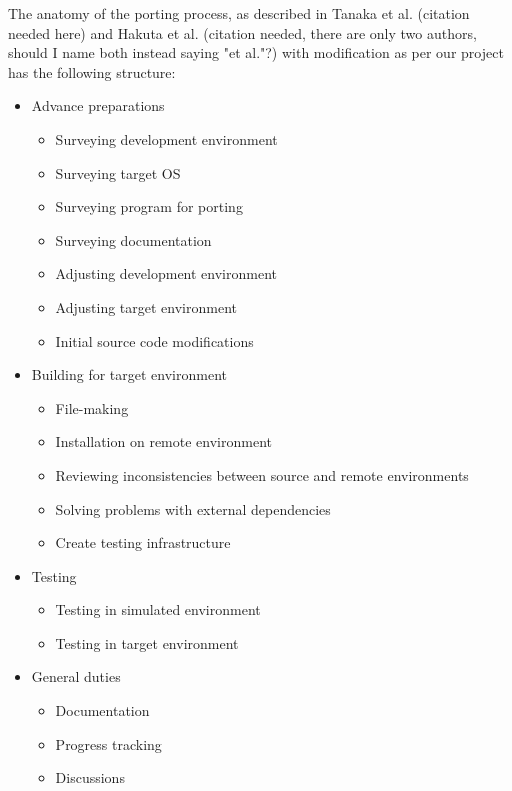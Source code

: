 The anatomy of the porting process, as described in Tanaka et al. (citation
needed here) and Hakuta et al. (citation needed, there are only two authors,
should I name both instead saying "et al."?) with modification as per our
project has the following structure:
\begin{itemize}
    \item Advance preparations
        \begin{itemize}
            \item Surveying development environment
            \item Surveying target OS
            \item Surveying program for porting
            \item Surveying documentation
            \item Adjusting development environment
            \item Adjusting target environment
            \item Initial source code modifications
        \end{itemize}
    \item Building for target environment
        \begin{itemize}
            \item File-making
            \item Installation on remote environment
            \item Reviewing inconsistencies between source and remote environments
            \item Solving problems with external dependencies
            \item Create testing infrastructure
        \end{itemize}
    \item Testing
        \begin{itemize}
            \item Testing in simulated environment
            \item Testing in target environment
        \end{itemize}
    \item General duties
        \begin{itemize}
            \item Documentation
            \item Progress tracking
            \item Discussions
        \end{itemize}
\end{itemize}


